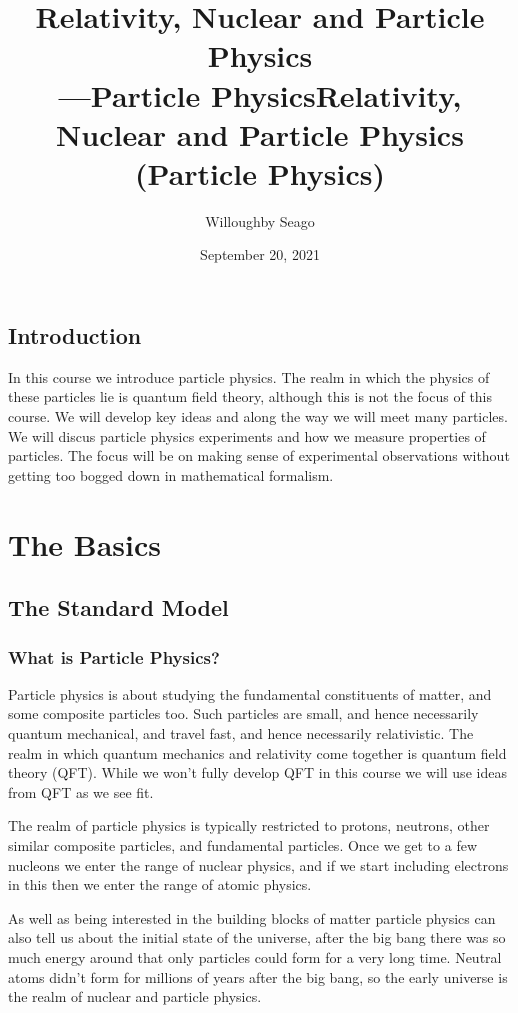\documentclass[fleqn]{NotesClass}
\title{Relativity, Nuclear and Particle Physics\\{\Huge---Particle Physics}}
\author{Willoughby Seago}
\date{September 20, 2021}
\begin{document}
    \frontmatter
    \titlepage
    \title{Relativity, Nuclear and Particle Physics (Particle Physics)}
    \innertitlepage{} 
    \tableofcontents
    \listoftables
    \mainmatter
    
    \chapter{Introduction}
    In this course we introduce particle physics.
    The realm in which the physics of these particles lie is quantum field theory, although this is not the focus of this course.
    We will develop key ideas and along the way we will meet many particles.
    We will discus particle physics experiments and how we measure properties of particles.
    The focus will be on making sense of experimental observations without getting too bogged down in mathematical formalism.
    
    \part{The Basics}
    \chapter{The Standard Model}
    \section{What is Particle Physics?}
    Particle physics is about studying the fundamental constituents of matter, and some composite particles too.
    Such particles are small, and hence necessarily quantum mechanical, and travel fast, and hence necessarily relativistic.
    The realm in which quantum mechanics and relativity come together is quantum field theory (QFT).
    While we won't fully develop QFT in this course we will use ideas from QFT as we see fit.
    
    The realm of particle physics is typically restricted to protons, neutrons, other similar composite particles, and fundamental particles.
    Once we get to a few nucleons we enter the range of nuclear physics, and if we start including electrons in this then we enter the range of atomic physics.
    
    As well as being interested in the building blocks of matter particle physics can also tell us about the initial state of the universe, after the big bang there was so much energy around that only particles could form for a very long time.
    Neutral atoms didn't form for millions of years after the big bang, so the early universe is the realm of nuclear and particle physics.
    
\end{document}
